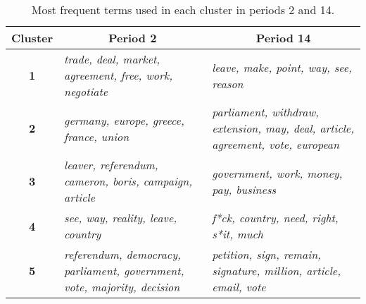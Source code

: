 \begin{table}[tbp]
	\newcommand\mywidth{5.5cm}
	\centering
	\caption{Most frequent terms used in each cluster in periods 2 and 14.}
	\label{fig:table_terms}
	\small
	\begin{tabular}{|c|p{\mywidth}|p{\mywidth}|}
	\hline
	\multicolumn{1}{|l|}{\textbf{Cluster}} & \multicolumn{1}{c|}{\textbf{Period 2}}                                                                              & \multicolumn{1}{c|}{\textbf{Period 14}}                                                                                           	\\ \hline

	\cellcolor[HTML]{F8766D}\textbf{1}   
    & \textit{trade, deal, market, agreement, free, work, negotiate}                  
    & \textit{leave, make, point, way, see, reason}                                                                                     	\\ \hline

	\cellcolor[HTML]{D89000}\textbf{2}     
	& \textit{germany, europe, greece, france, union}                                                                            
	& \textit{parliament, withdraw, extension, may, deal, article, agreement, vote, european} 
	\\ \hline

	\cellcolor[HTML]{A3A500}\textbf{3}     
	& \textit{leaver, referendum, cameron, boris, campaign, article}                   
	& \textit{government, work, money, pay, business}                                                                                   
	\\ \hline

	\cellcolor[HTML]{39B600}\textbf{4}     
	& \textit{see, way, reality, leave, country}                                                                                 
	& \textit{f*ck, country, need, right, s*it, much}                                                                                   
	\\ \hline

	\cellcolor[HTML]{00BF7D}\textbf{5}     
	& \textit{referendum, democracy, parliament, government, vote, majority, decision} 
	& \textit{petition, sign, remain, signature, million, article, email, vote}               
	\\ \hline



\end{tabular}
\end{table}
